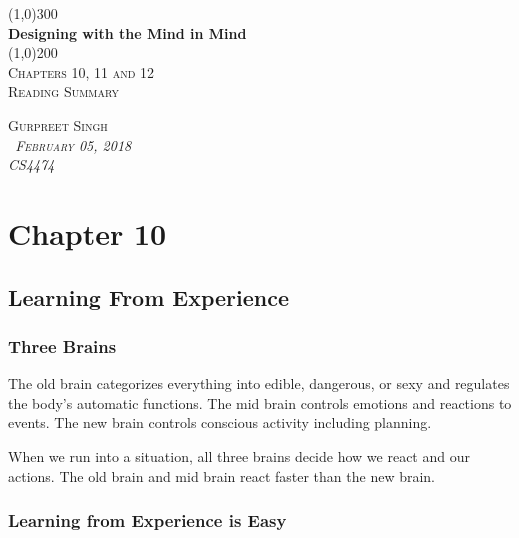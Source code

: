 \documentclass[11pt,]{article}
\begin{document}
\begin{titlepage}
    \begin{center}
    \line(1,0){300} \\ 
    [0.25in]
    \huge{\bfseries Designing with the Mind in Mind} \\
    [2mm]
    \line(1,0){200} \\
    [1.5cm] 
    \textsc{\Large Chapters 10, 11 and 12} \\
    [0.75cm]
    \textsc{\Large Reading Summary} \\
    [12cm]
    \end{center}
    
    \begin{flushright}
    \textsc{\Large{Gurpreet Singh \\}\normalsize\emph{\ February 05, 2018 \\}\normalsize\emph{CS4474 \\} }
    
    \end{flushright}

\end{titlepage}

\newpage
\shipout\null

\hypertarget{chapter-10}{%
\section{Chapter 10}\label{chapter-10}}

\hypertarget{learning-from-experience}{%
\subsection{Learning From Experience}\label{learning-from-experience}}

\hypertarget{three-brains}{%
\subsubsection{Three Brains}\label{three-brains}}

The old brain categorizes everything into edible, dangerous, or sexy and
regulates the body's automatic functions. The mid brain controls
emotions and reactions to events. The new brain controls conscious
activity including planning.

When we run into a situation, all three brains decide how we react and
our actions. The old brain and mid brain react faster than the new
brain.

\hypertarget{learning-from-experience-is-easy}{%
\subsubsection{Learning from Experience is
Easy}\label{learning-from-experience-is-easy}}
\end{document}
